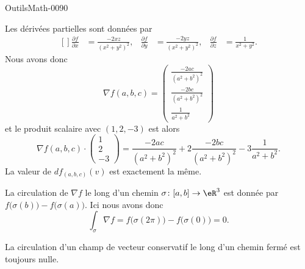 
\begin{corrige}{OutilsMath-0090}

    Les dérivées partielles sont données par
    \begin{equation}
        \begin{aligned}[]
            \frac{ \partial f }{ \partial x }&=\frac{ -2xz }{ (x^2+y^2)^2 },&\frac{ \partial f }{ \partial y }&=\frac{ -2yz }{ (x^2+y^2)^2 },&\frac{ \partial f }{ \partial z }&=\frac{1}{ x^2+y^2 }.
        \end{aligned}
    \end{equation}
    Nous avons donc
    \begin{equation}
        \nabla f(a,b,c)=\begin{pmatrix}
            \frac{ -2ac }{ (a^2+b^2)^2 }    \\ 
            \frac{ -2bc }{ (a^2+b^2)^2 }    \\ 
            \frac{ 1 }{ a^2+b^2 }    
        \end{pmatrix}
    \end{equation}
    et le produit scalaire avec $(1,2,-3)$ est alors 
    \begin{equation}
        \nabla f(a,b,c)\cdot\begin{pmatrix}
            1    \\ 
            2    \\ 
            -3    
        \end{pmatrix}=
            \frac{ -2ac }{ (a^2+b^2)^2 }  +2        \frac{ -2bc }{ (a^2+b^2)^2 }    -3        \frac{ 1 }{ a^2+b^2 }    .
    \end{equation}
    La valeur de $df_{(a,b,c)}(v)$ est exactement la même.

    La circulation de $\nabla f$ le long d'un chemin $\sigma\colon \mathopen[ a , b \mathclose]\to \eR^3$ est donnée par $f\big( \sigma(b) \big)-f\big( \sigma(a) \big)$. Ici nous avons donc
    \begin{equation}
        \int_{\sigma}\nabla f=f\big( \sigma(2\pi) \big)-f\big( \sigma(0) \big)=0.
    \end{equation}
    
    La circulation d'un champ de vecteur conservatif le long d'un chemin fermé est toujours nulle.


\end{corrige}

